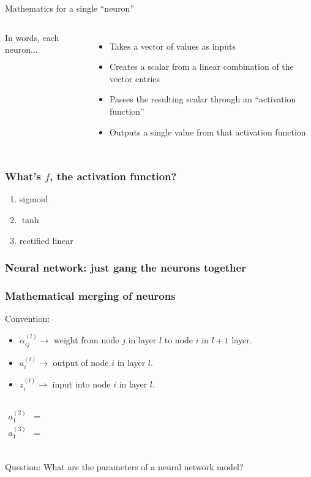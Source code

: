 \documentclass[mathserif, aspectratio=169]{beamer}
\begin{document}
\begin{frame}{Mathematics for a single ``neuron''}   
    \begin{columns}
    		In words, each neuron...
    		\begin{itemize}
    			\item Takes a vector of values as inputs
    			\item Creates a scalar from a linear combination of the vector entries
    			\item Passes the resulting scalar through an ``activation function''
    			\item Outputs a single value from that activation function
    		\end{itemize}
	    	
    \end{columns}
\end{frame}


\begin{frame}[t]\frametitle{What's $f$, the activation function?}
    \begin{enumerate}
    	\item sigmoid
    	\vspace{15mm}
    	\item $\tanh$
    	\vspace{15mm}
    	\item rectified linear
    \end{enumerate}
\end{frame}

\begin{frame}[t]\frametitle{Neural network: just gang the neurons together}
    
\end{frame}

\begin{frame}[t]\frametitle{Mathematical merging of neurons}
    Convention:
    \begin{itemize}
    	\item $\alpha_{ij}^{(l)} \rightarrow$ weight from node $j$ in layer $l$ to node $i$ in $l+1$ layer.
    	\item $a_{i}^{(l)} \rightarrow$ output of node $i$ in layer $l$.
    	\item $z_i^{(l)} \rightarrow$ input into node $i$ in layer $l$.
    \end{itemize}

    \begin{columns}
    	    \begin{align*}
		     	a_1^{(2)} &= \\
		     	a_1^{(3)} &= \\
		    \end{align*}
    \end{columns}
    
    Question: What are the parameters of a neural network model?
\end{frame}
\end{document}

